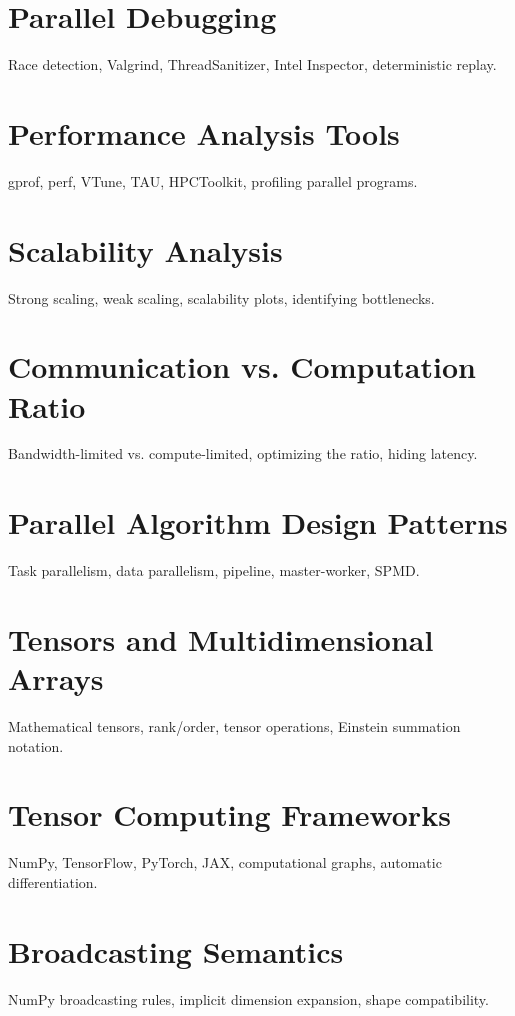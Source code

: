 \chapter{Parallel Debugging}
Race detection, Valgrind, ThreadSanitizer, Intel Inspector, deterministic replay.

\chapter{Performance Analysis Tools}
gprof, perf, VTune, TAU, HPCToolkit, profiling parallel programs.

\chapter{Scalability Analysis}
Strong scaling, weak scaling, scalability plots, identifying bottlenecks.

\chapter{Communication vs. Computation Ratio}
Bandwidth-limited vs. compute-limited, optimizing the ratio, hiding latency.

\chapter{Parallel Algorithm Design Patterns}
Task parallelism, data parallelism, pipeline, master-worker, SPMD.


\chapter{Tensors and Multidimensional Arrays}
Mathematical tensors, rank/order, tensor operations, Einstein summation notation.

\chapter{Tensor Computing Frameworks}
NumPy, TensorFlow, PyTorch, JAX, computational graphs, automatic differentiation.

\chapter{Broadcasting Semantics}
NumPy broadcasting rules, implicit dimension expansion, shape compatibility.

